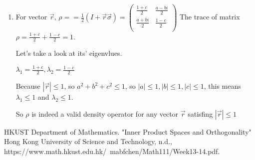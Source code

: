 \documentclass{article}
\begin{document}
\begin{enumerate}
          

    \item For vector $\vec{r}$, $\rho==\frac{1}{2}(I+\vec{r}\vec{\sigma})=\left(
              \begin{array}{cc}
                      \frac{1+c}{2} & \frac{a-bi}{2} \\\frac{a+bi}{2}&\frac{1-c}{2}\\
                  \end{array}
              \right)$
          The trace of matrix $\rho=\frac{1+c}{2}+\frac{1-c}{2}=1$.

          Let's take a look at its' eigenvlues.

          $\lambda_1=\frac{1+c}{2},\lambda_2=\frac{1-c}{2}$

          Because $|\vec{r}|\leq1$, so $a^2+b^2+c^2\leq1$, so $|a|\leq1,|b|\leq1,|c|\leq1$,
          this means $\lambda_1\leq1$ and $\lambda_2\leq1$.

          So $\rho$ is indeed a valid density operator for any vector $\vec{r}$ satisfing $|\vec{r}|\leq1$
\end{enumerate}
\begin{thebibliography}{1}
    HKUST Department of Mathematics.
    "Inner Product Spaces and Orthogonality"
    Hong Kong University of Science and Technology, n.d.,
    https://www.math.hkust.edu.hk/~mabfchen/Math111/Week13-14.pdf.
\end{thebibliography}
\end{document}
